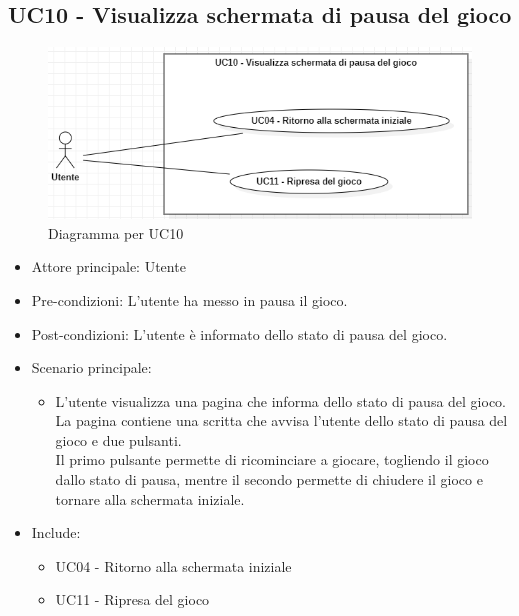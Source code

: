 \subsection{UC10 - Visualizza schermata di pausa del gioco}
\begin{figure}[h]
    \centering
    \includegraphics[width=400pt]{images/usecase/UC10.png}
    \caption{Diagramma per UC10}
    \label{fig:UC10}
\end{figure}
\begin{itemize}
    \item Attore principale: Utente
    \item Pre-condizioni: L'utente ha messo in pausa il gioco.
    \item Post-condizioni: L'utente è informato dello stato di pausa del gioco.
    \item Scenario principale: \begin{itemize}
        \item L'utente visualizza una pagina che informa dello stato di pausa del gioco.\\ La pagina contiene una scritta che avvisa l'utente dello stato di pausa del gioco e due pulsanti.\\ Il primo pulsante permette di ricominciare a giocare, togliendo il gioco dallo stato di pausa, mentre il secondo permette di chiudere il gioco e tornare alla schermata iniziale.
    \end{itemize}
    \item Include: \begin{itemize}
        \item UC04 - Ritorno alla schermata iniziale
        \item UC11 - Ripresa del gioco
    \end{itemize}
\end{itemize}


